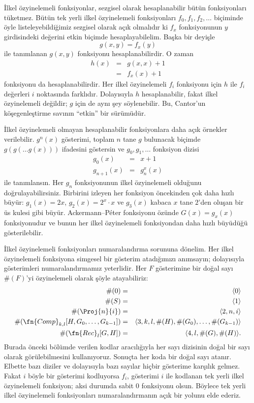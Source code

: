\documentclass[../../../include/open-logic-section]{subfiles}
\begin{document}

İlkel özyinelemeli fonksiyonlar, sezgisel olarak hesaplanabilir bütün
fonksiyonları tüketmez. Bütün tek yerli ilkel özyinelemeli fonksiyonları
$f_0,f_1,f_2,\dots$ biçiminde öyle listeleyebildiğimiz sezgisel olarak açık
olmalıdır ki $f_x$ fonksiyonunun $y$ girdisindeki değerini etkin biçimde
hesaplayabilelim. Başka bir deyişle
\[
  g(x,y)=f_x(y)
\]
ile tanımlanan $g(x,y)$ fonksiyonu hesaplanabilirdir. O zaman
\begin{eqnarray*}
  h(x) & = & g(x,x)+1\\
       & = & f_x(x)+1
\end{eqnarray*}
fonksiyonu da hesaplanabilirdir. Her ilkel özyinelemeli $f_i$ fonksiyonu
için $h$ ile $f_i$ değerleri $i$ noktasında farklıdır. Dolayısıyla $h$
hesaplanabilir, fakat ilkel özyinelemeli değildir; $g$ için de aynı şey
söylenebilir. Bu, Cantor'un köşegenleştirme savının ``etkin'' bir sürümüdür.

İlkel özyinelemeli olmayan hesaplanabilir fonksiyonlara daha açık örnekler
verilebilir. $g^n(x)$ gösterimi, toplam $n$ tane $g$ bulunacak biçimde
$g(g(\dots g(x)))$ ifadesini göstersin ve $g_0,g_1,\dots$ fonksiyon dizisi
\begin{eqnarray*}
  g_0(x) & = & x+1\\
  g_{n+1}(x) & = & g_n^x(x)
\end{eqnarray*}
ile tanımlansın. Her $g_n$ fonksiyonunun ilkel özyinelemeli olduğunu
doğrulayabilirsiniz. Birbirini izleyen her fonksiyon öncekinden çok daha hızlı
büyür: $g_1(x)=2x$, $g_2(x)=2^x\cdot x$ ve $g_3(x)$ kabaca $x$ tane $2$'den
oluşan bir üs kulesi gibi büyür. Ackermann--P\'eter fonksiyonu özünde
$G(x)=g_x(x)$ fonksiyonudur ve bunun her ilkel özyinelemeli fonksiyondan daha
hızlı büyüdüğü gösterilebilir.

İlkel özyinelemeli fonksiyonları numaralandırma sorununa dönelim. Her ilkel
özyinelemeli fonksiyona simgesel bir gösterim atadığımızı anımsayın; dolayısıyla
gösterimleri numaralandırmamız yeterlidir. Her $F$ gösterimine bir doğal sayı
$\#(F)$'yi özyinelemeli olarak şöyle atayabiliriz:
\begin{eqnarray*}
  \#(0) & = & \langle0\rangle\\
  \#(S) & = & \langle1\rangle\\
  \#(\Proj{n}{i}) & = & \langle2,n,i\rangle\\
  \#(\fn{Comp}_{k,l}[H,G_0,\dots,G_{k-1}]) & = &
    \langle3,k,l,\#(H),\#(G_0),\dots,\#(G_{k-1})\rangle\\
  \#(\fn{Rec}_l[G,H]) & = & \langle4,l,\#(G),\#(H)\rangle.
\end{eqnarray*}
Burada önceki bölümde verilen kodlar aracılığıyla her sayı dizisinin doğal
bir sayı olarak görülebilmesini kullanıyoruz. Sonuçta her koda bir doğal sayı
atanır. Elbette bazı diziler ve dolayısıyla bazı sayılar hiçbir gösterime
karşılık gelmez. Fakat $i$ böyle bir gösterimi kodluyorsa $f_i$, gösterimi
$i$ ile kodlanan tek yerli ilkel özyinelemeli fonksiyon; aksi durumda sabit
$0$ fonksiyonu olsun. Böylece tek yerli ilkel özyinelemeli fonksiyonları
numaralandırmanın açık bir yolunu elde ederiz.
\end{document}

